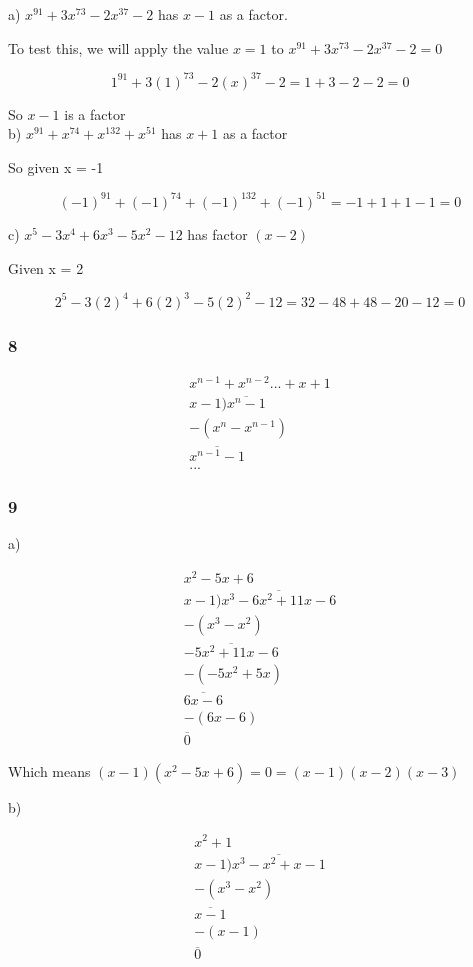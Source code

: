\documentclass[]{report}
\begin{document}
a) $x^91 + 3x^73 - 2x^37 -2$ has $x-1$ as a factor.

To test this, we will apply the value $x = 1$ to $x^91 + 3x^73 - 2x^37 -2 = 0$

\[
1^91 + 3(1)^73 - 2(x)^37 - 2 = 1 + 3 - 2 - 2 = 0
\]

So $x-1$ is a factor\\

b) $x^91 + x^74 + x^132 + x^51$ has $x+1$ as a factor

So given x = -1

\[
(-1)^91 + (-1)^74 + (-1)^132 + (-1)^51 = -1 + 1 + 1 - 1 = 0
\]

c) $x^5  - 3x^4 + 6x^3 - 5x^2 - 12$ has factor $(x-2)$

Given x = 2

\[
2^5 - 3(2)^4 + 6(2)^3 - 5(2)^2 - 12 = 32 - 48 + 48 -20 - 12 = 0
\]

\subsubsection{8}

\begin{align*}
x^{n-1} + x^{n-2} ...  + x + 1\\
x-1)\overline{x^n -1}\\
- (x^n - x^{n-1}) \\
\overline{x^{n-1} - 1}\\
...
\end{align*}

\subsubsection{9}

a) 

\begin{align*}
x^2  -5x + 6\\
x-1 ) \overline{x^3 - 6x^2 + 11x - 6}\\
- (x^3 -x^2)\\
\overline{-5x^2 + 11x - 6} \\
-(-5x^2 + 5x)\\
\overline{6x - 6}\\
-(6x -6) \\
\overline{0}
\end{align*}

Which means $(x-1)(x^2  -5x + 6) = 0 = (x-1)(x - 2)(x - 3)$

b)

\begin{align*}
x^2 + 1\\
x-1) \overline{x^3 -x^2 + x - 1}\\
-(x^3 -x^2)\\
\overline{x - 1}\\
- (x - 1)\\
\overline{0}
\end{align*}
\end{document}
